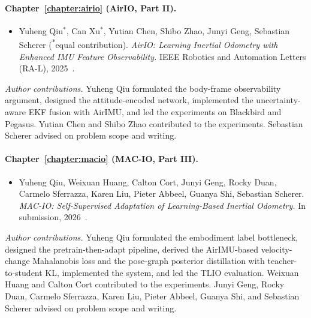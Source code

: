 \paragraph{Chapter~\ref{chapter:airio} (AirIO, Part II).}
\begin{itemize}
    \item Yuheng Qiu$^*$, Can Xu$^*$, Yutian Chen, Shibo Zhao, Junyi Geng, Sebastian Scherer (\textsuperscript{$*$}equal contribution). \emph{AirIO: Learning Inertial Odometry with Enhanced IMU Feature Observability.} IEEE Robotics and Automation Letters (RA-L), 2025~\cite{qiu2025airio}.
\end{itemize}
\textit{Author contributions.}
Yuheng Qiu formulated the body-frame observability argument, designed the attitude-encoded network, implemented the uncertainty-aware EKF fusion with AirIMU, and led the experiments on Blackbird and Pegasus.
Yutian Chen and Shibo Zhao contributed to the experiments.
Sebastian Scherer advised on problem scope and writing.

\paragraph{Chapter~\ref{chapter:macio} (MAC-IO, Part III).}
\begin{itemize}
    \item Yuheng Qiu, Weixuan Huang, Calton Cort, Junyi Geng, Rocky Duan, Carmelo Sferrazza, Karen Liu, Pieter Abbeel, Guanya Shi, Sebastian Scherer. \emph{MAC-IO: Self-Supervised Adaptation of Learning-Based Inertial Odometry.} In submission, 2026~\cite{qiu2026macio}.
\end{itemize}
\textit{Author contributions.}
Yuheng Qiu formulated the embodiment label bottleneck, designed the pretrain-then-adapt pipeline, derived the AirIMU-based velocity-change Mahalanobis loss and the pose-graph posterior distillation with teacher-to-student KL, implemented the system, and led the TLIO evaluation.
Weixuan Huang and Calton Cort contributed to the experiments.
Junyi Geng, Rocky Duan, Carmelo Sferrazza, Karen Liu, Pieter Abbeel, Guanya Shi, and Sebastian Scherer advised on problem scope and writing.


